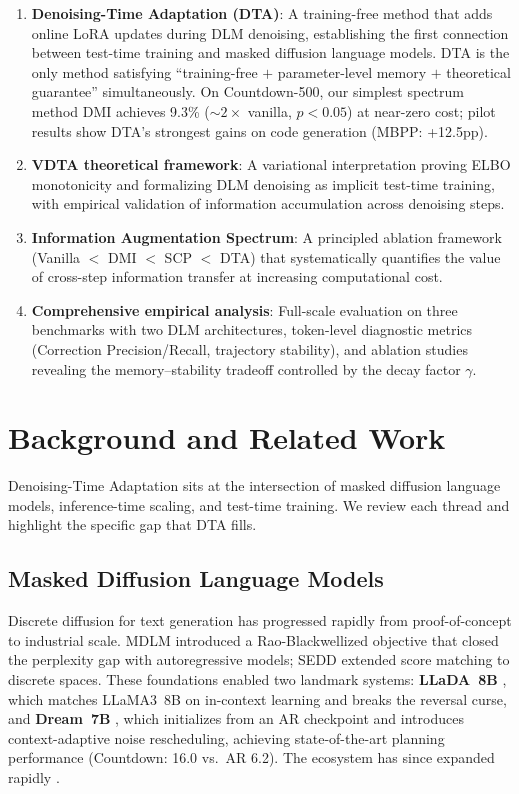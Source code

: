 \documentclass{article}
\begin{document}
\begin{enumerate}
    \item \textbf{Denoising-Time Adaptation (DTA)}: A training-free method that adds online LoRA updates during DLM denoising, establishing the first connection between test-time training and masked diffusion language models. DTA is the only method satisfying ``training-free $+$ parameter-level memory $+$ theoretical guarantee'' simultaneously. On Countdown-500, our simplest spectrum method DMI achieves 9.3\% (${\sim}2{\times}$ vanilla, $p < 0.05$) at near-zero cost; pilot results show DTA's strongest gains on code generation (MBPP: +12.5pp).
    \item \textbf{VDTA theoretical framework}: A variational interpretation proving ELBO monotonicity and formalizing DLM denoising as implicit test-time training, with empirical validation of information accumulation across denoising steps.
    \item \textbf{Information Augmentation Spectrum}: A principled ablation framework (Vanilla $<$ DMI $<$ SCP $<$ DTA) that systematically quantifies the value of cross-step information transfer at increasing computational cost.
    \item \textbf{Comprehensive empirical analysis}: Full-scale evaluation on three benchmarks with two DLM architectures, token-level diagnostic metrics (Correction Precision/Recall, trajectory stability), and ablation studies revealing the memory--stability tradeoff controlled by the decay factor $\gamma$.
\end{enumerate}

\section{Background and Related Work}
\label{sec:related}

Denoising-Time Adaptation sits at the intersection of masked diffusion language models, inference-time scaling, and test-time training. We review each thread and highlight the specific gap that DTA fills.

\subsection{Masked Diffusion Language Models}

Discrete diffusion for text generation has progressed rapidly from proof-of-concept to industrial scale. MDLM \citep{sahoo2024mdlm} introduced a Rao-Blackwellized objective that closed the perplexity gap with autoregressive models; SEDD \citep{lou2024sedd} extended score matching to discrete spaces. These foundations enabled two landmark systems: \textbf{LLaDA~8B} \citep{nie2025llada}, which matches LLaMA3~8B on in-context learning and breaks the reversal curse, and \textbf{Dream~7B} \citep{dream2025}, which initializes from an AR checkpoint and introduces context-adaptive noise rescheduling, achieving state-of-the-art planning performance (Countdown: 16.0 vs.\ AR 6.2). The ecosystem has since expanded rapidly \citep{llada15_2025, llada_moe_2025, dreamcoder2025, geminidiffusion2025, svete2025reasoning, jiang2025optimal}.
\end{document}
